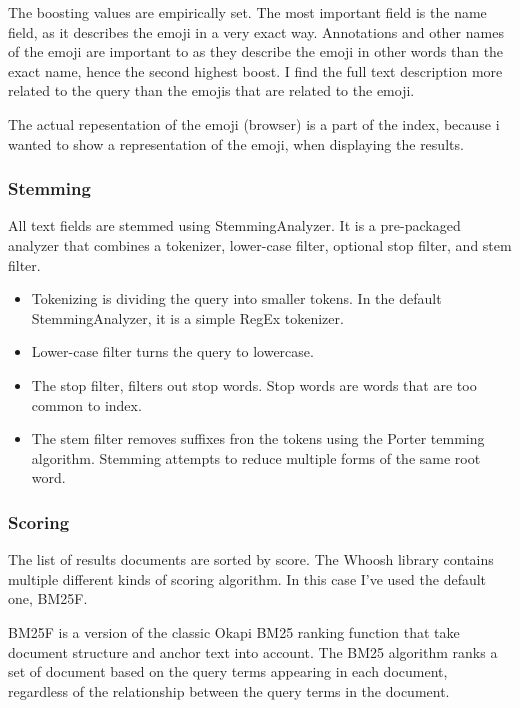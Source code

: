 \documentclass[a4paper]{article}
\begin{document}
The boosting values are empirically set. The most important field is the name field, as it describes the emoji in a very exact way. Annotations and other names of the emoji are important to as they describe the emoji in other words than the exact name, hence the second highest boost. I find the full text description more related to the query than the emojis that are related to the emoji.

The actual repesentation of the emoji (browser) is a part of the index, because i wanted to show a representation of the emoji, when displaying the results.


\subsubsection{Stemming} %
\label{ssub:stemming}

All text fields are stemmed using StemmingAnalyzer. It is a pre-packaged analyzer that combines a tokenizer, lower-case filter, optional stop filter, and stem filter.

\begin{itemize}
\item Tokenizing is dividing the query into smaller tokens. In the default StemmingAnalyzer, it is a simple RegEx tokenizer.
\item Lower-case filter turns the query to lowercase.
\item The stop filter, filters out stop words. Stop words are words that are too common to index.
\item The stem filter removes suffixes fron the tokens using the Porter temming algorithm. Stemming attempts to reduce multiple forms of the same root word.
\end{itemize}


\subsubsection{Scoring} %
\label{ssub:scoring}

The list of results documents are sorted by score. The Whoosh library contains multiple different kinds of scoring algorithm. In this case I've used the default one, BM25F.

BM25F is a version of the classic Okapi BM25 ranking function that take document structure and anchor text into account. The BM25 algorithm ranks a set of document based on the query terms appearing in each document, regardless of the relationship between the query terms in the document.
\end{document}
